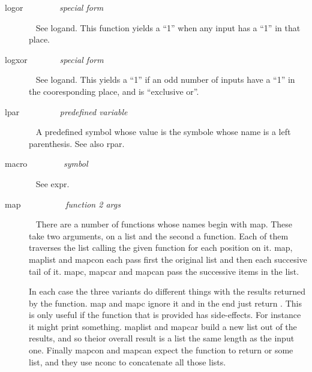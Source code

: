 \begin{description}
\item[{\tx logor~~~~~~~~} \hspace{1cm} {\em special form}]~\newline
See {\tx logand}. This function yields a ``1'' when any input has
a ``1'' in that place.
\item[{\tx logxor~~~~~~~} \hspace{1cm} {\em special form}]~\newline
See {\tx logand}. This yields a ``1'' if an odd number of inputs have a ``1''
in the cooresponding place, and is ``exclusive or''.
\item[{\tx lpar~~~~~~~~~} \hspace{1cm} {\em predefined variable}]~\newline
A predefined symbol whose value is the symbole whose name is a left
parenthesis. See also {\tx rpar}.
\item[{\tx macro~~~~~~~~} \hspace{1cm} {\em symbol}]~\newline
See {\tx expr}.
\item[{\tx map~~~~~~~~~~} \hspace{1cm} {\em function 2 args}]~\newline
There are a number of functions whose names begin with {\tx map}. These
take two arguments, on a list and the second a function. Each of them
traverses the list calling the given function for each position on it.
{\tx map}, {\tx maplist} and {\tx mapcon} each pass first the original list
and then each succesive tail of it. {\tx mapc}, {\tx mapcar} and {\tx mapcan}
pass the successive items in the list.

In each case the three variants do different things with the results returned
by the function. {\tx map} and {\tx mapc} ignore it and in the end just return
\nil. This is only useful if the function that is provided has side-effects. For
instance it might print something. {\tx maplist} and {\tx mapcar} build a new
list out of the results, and so theior overall result is a list the same
length as the input one. Finally {\tx mapcon} and {\tx mapcan} expect the
function to return \nil{} or some list, and they use {\tx nconc} to
concatenate all those lists.


\end{description}
